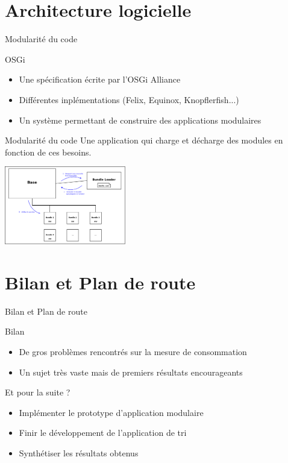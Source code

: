 \documentclass{beamer}
\begin{document}
    \section{Architecture logicielle}
	\begin{frame}{Modularité du code}
	    \begin{block}{OSGi}
		\begin{itemize}
		    \item Une spécification écrite par l'OSGi Alliance
		    \item Différentes inplémentations (Felix, Equinox, Knopflerfish...)
		    \item Un système permettant de construire des applications modulaires
		\end{itemize}
	    \end{block}
	\end{frame}
	\begin{frame}{Modularité du code}
	Une application qui charge et décharge des modules en fonction de ces besoins.
	    \begin{center}
		\includegraphics[width=200px]{../../Figures/OSGi/EcoPattern_General_Figure.png}
	    \end{center}
	\end{frame}
	
    \section{Bilan et Plan de route}
	\begin{frame}{Bilan et Plan de route}
		\begin{block}{Bilan}
		\begin{itemize}
			\item De gros problèmes rencontrés sur la mesure de consommation
			\item Un sujet très vaste mais de premiers résultats encourageants
		\end{itemize}
		\end{block}
		\begin{block}{Et pour la suite ?}
		\begin{itemize}
			\item Implémenter le prototype d'application modulaire
			\item Finir le développement de l'application de tri
			\item Synthétiser les résultats obtenus
		\end{itemize}
		\end{block}
	\end{frame}
\end{document}
